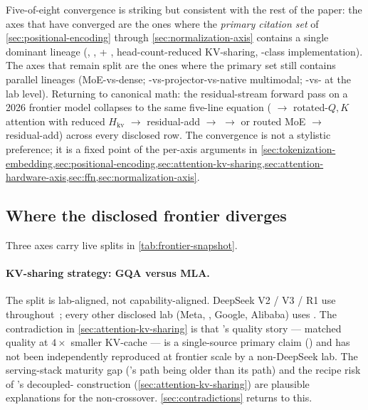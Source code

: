 \begin{intuition}
Five-of-eight convergence is striking but consistent with the rest
of the paper: the axes that have converged are the ones where the
\emph{primary citation set} of \cref{sec:positional-encoding} through
\cref{sec:normalization-axis} contains a single dominant lineage
(, ,  + , head-count-reduced KV-sharing,
-class implementation). The axes that remain split
are the ones where the primary set still contains parallel
lineages (MoE-vs-dense; -vs-projector-vs-native
multimodal; -vs- at the lab level). Returning to canonical
math: the residual-stream forward pass on a 2026 frontier model
collapses to the same five-line equation ( $\to$ rotated-$Q,K$
attention with reduced $H_{\mathrm{kv}}$ $\to$ residual-add $\to$
 $\to$   or routed  MoE $\to$ residual-add)
across every disclosed row. The convergence is not a stylistic
preference; it is a fixed point of the per-axis arguments in
\cref{sec:tokenization-embedding,sec:positional-encoding,sec:attention-kv-sharing,sec:attention-hardware-axis,sec:ffn,sec:normalization-axis}.
\end{intuition}

\subsection{Where the disclosed frontier diverges}
\label{sec:snapshot-divergence}

Three axes carry live splits in \cref{tab:frontier-snapshot}.

\paragraph{KV-sharing strategy: GQA versus MLA.}
The split is lab-aligned, not capability-aligned. DeepSeek V2 / V3 /
R1 use  throughout~\citep{deepseek-v2,deepseek-v3,deepseek-r1};
every other disclosed lab (Meta, , Google, Alibaba) uses .
The contradiction in \cref{sec:attention-kv-sharing} is that 's
quality story --- matched  quality at $4\times$ smaller KV-cache
--- is a single-source primary claim
(\citealp{deepseek-v2}) and has not been independently reproduced
at frontier scale by a non-DeepSeek lab. The serving-stack maturity
gap ('s  path being older than its  path) and
the recipe risk of 's decoupled- construction
(\cref{sec:attention-kv-sharing}) are plausible explanations for the
non-crossover. \cref{sec:contradictions} returns to this.

